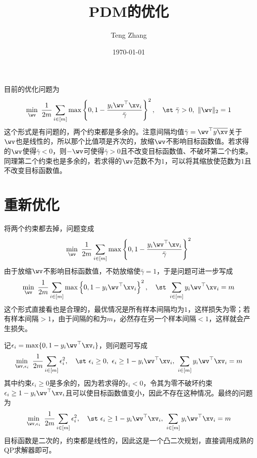\documentclass{ctexart}
\begin{document}
\title{PDM的优化}
\author{Teng Zhang}
\date{\today}
\maketitle

目前的优化问题为
\begin{align*}
    \min_{\wv} ~ \frac{1}{2m} \sum_{i \in [m]} \max \left\{ 0, 1 - \frac{y_i \wv^\top \xv_i}{\bar{\gamma}} \right\}^2, \quad \st ~ \bar{\gamma} > 0, ~ \| \wv \|_2 = 1
\end{align*}
这个形式是有问题的，两个约束都是多余的。注意间隔均值$\bar{\gamma} = \wv^\top \overline{y \xv}$关于$\wv$也是线性的，所以那个比值项是齐次的，放缩$\wv$不影响目标函数值。若求得的$\wv$使得$\bar{\gamma} < 0$，则$-\wv$可使得$\bar{\gamma} > 0$且不改变目标函数值、不破坏第二个约束。同理第二个约束也是多余的，若求得的$\wv$范数不为$1$，可以将其缩放使范数为$1$且不改变目标函数值。

\section{重新优化}

将两个约束都去掉，问题变成
\begin{align*}
    \min_{\wv} ~ \frac{1}{2m} \sum_{i \in [m]} \max \left\{ 0, 1 - \frac{y_i \wv^\top \xv_i}{\bar{\gamma}} \right\}^2
\end{align*}
由于放缩$\wv$不影响目标函数值，不妨放缩使$\bar{\gamma} = 1$，于是问题可进一步写成
\begin{align*}
    \min_{\wv} ~ \frac{1}{2m} \sum_{i \in [m]} \max \left\{ 0, 1 - y_i \wv^\top \xv_i \right\}^2, \quad \st ~ \sum_{i \in [m]} y_i \wv^\top \xv_i = m
\end{align*}
这个形式直接看也是合理的，最优情况是所有样本间隔均为$1$，这样损失为零；若有样本间隔$> 1$，由于间隔的和为$m$，必然存在另一个样本间隔$< 1$，这样就会产生损失。

记$\epsilon_i = \max \{ 0, 1 - y_i \wv^\top \xv_i \}$，则问题可写成
\begin{align*}
    \min_{\wv, \epsilon_i} ~ \frac{1}{2m} \sum_{i \in [m]} \epsilon_i^2, \quad \st ~ \epsilon_i \ge 0, ~ \epsilon_i \ge 1 - y_i \wv^\top \xv_i, ~ \sum_{i \in [m]} y_i \wv^\top \xv_i = m
\end{align*}
其中约束$\epsilon_i \ge 0$是多余的，因为若求得的$\epsilon_i < 0$，令其为零不破坏约束$\epsilon_i \ge 1 - y_i \wv^\top \xv_i$且可以使目标函数值变小，因此不存在这种情况。最终的问题为
\begin{align} \label{eq: primal}
    \min_{\wv, \epsilon_i} ~ \frac{1}{2m} \sum_{i \in [m]} \epsilon_i^2, \quad \st ~ \epsilon_i \ge 1 - y_i \wv^\top \xv_i, ~ \sum_{i \in [m]} y_i \wv^\top \xv_i = m
\end{align}
目标函数是二次的，约束都是线性的，因此这是一个凸二次规划，直接调用成熟的QP求解器即可。
\end{document}
